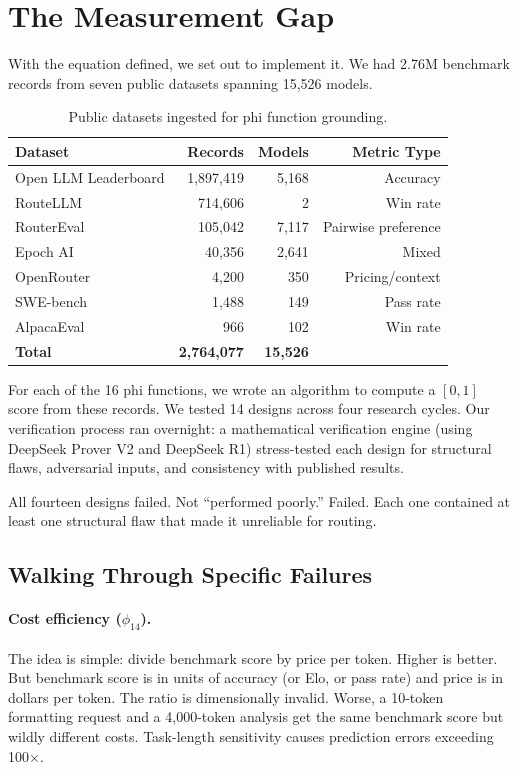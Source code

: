 \section{The Measurement Gap}
\label{sec:measurement}

With the equation defined, we set out to implement it. We had 2.76M benchmark records from seven public datasets spanning 15,526 models.

\begin{table}[h]
\centering
\caption{Public datasets ingested for phi function grounding.}
\label{tab:datasets}
\small
\begin{tabular}{lrrr}
\toprule
\textbf{Dataset} & \textbf{Records} & \textbf{Models} & \textbf{Metric Type} \\
\midrule
Open LLM Leaderboard & 1,897,419 & 5,168 & Accuracy \\
RouteLLM & 714,606 & 2 & Win rate \\
RouterEval & 105,042 & 7,117 & Pairwise preference \\
Epoch AI & 40,356 & 2,641 & Mixed \\
OpenRouter & 4,200 & 350 & Pricing/context \\
SWE-bench & 1,488 & 149 & Pass rate \\
AlpacaEval & 966 & 102 & Win rate \\
\midrule
\textbf{Total} & \textbf{2,764,077} & \textbf{15,526} & \\
\bottomrule
\end{tabular}
\end{table}

For each of the 16 phi functions, we wrote an algorithm to compute a $[0,1]$ score from these records. We tested 14 designs across four research cycles. Our verification process ran overnight: a mathematical verification engine (using DeepSeek Prover V2 and DeepSeek R1) stress-tested each design for structural flaws, adversarial inputs, and consistency with published results.

All fourteen designs failed. Not ``performed poorly.'' Failed. Each one contained at least one structural flaw that made it unreliable for routing.

\subsection{Walking Through Specific Failures}

\paragraph{Cost efficiency ($\phi_{14}$).} The idea is simple: divide benchmark score by price per token. Higher is better. But benchmark score is in units of accuracy (or Elo, or pass rate) and price is in dollars per token. The ratio is dimensionally invalid. Worse, a 10-token formatting request and a 4,000-token analysis get the same benchmark score but wildly different costs. Task-length sensitivity causes prediction errors exceeding 100$\times$.

